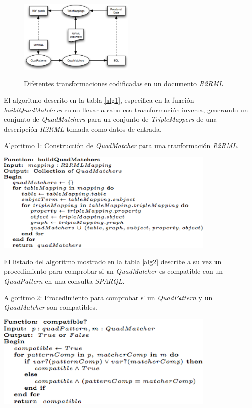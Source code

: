\begin{figure}
\vspace{2.4in}
\caption{Diferentes transformaciones codificadas en un documento \textit{R2RML}}
\includegraphics[width=0.5\textwidth]{figura2}
\label{figura2}
\end{figure}


El algoritmo descrito en la tabla \ref{alg1}, especifica en la funci\'on \textit{buildQuadMatchers} como llevar a cabo esa transformaci\'on inversa, generando un conjunto de \textit{QuadMatchers} para un conjunto de \textit{TripleMappers} de una descripci\'on \textit{R2RML} tomada como datos de entrada.\\

\begin{table}
\vspace{2.4in}
\caption{Algoritmo 1: Construcci\'on de \textit{QuadMatcher} para una tranformaci\'on \textit{R2RML}.}
\includegraphics[width=0.8\textwidth]{algoritmo1}
\label{alg1}
\end{table}

El listado del algoritmo mostrado en la tabla \ref{alg2} describe a su vez un procedimiento para comprobar si un \textit{QuadMatcher} es compatible con un \textit{QuadPattern} en una consulta \textit{SPARQL}.\\

\begin{table}
\vspace{2.4in}
\caption{Algoritmo 2: Procedimiento para comprobar si un \textit{QuadPattern} y un \textit{QuadMatcher} son compatibles.}
\includegraphics[width=0.8\textwidth]{algoritmo2}
\label{alg2}
\end{table}

